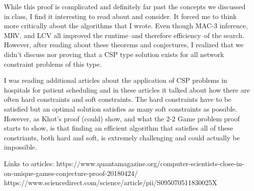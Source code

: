 \documentclass{article}
\begin{document}
While this proof is complicated and definitely far past the concepts we discussed in class, I find it interesting to read about and consider. It forced me to think more critically about the algorithms that I wrote. Even though MAC-3 inference, MRV, and LCV all improved the runtime--and therefore efficiency--of the search. However, after reading about these theorems and conjectures, I realized that we didn't discuss nor proving that a CSP type solution exists for all network constraint problems of this type. 

I was reading additional articles about the application of CSP problems in hospitals for patient scheduling and in these articles it talked about how there are often hard constraints and soft constraints. The hard constraints have to be satisfied but an optimal solution satisfies as many soft constraints as possible. However, as Khot's proof (could) show, and what the 2-2 Game problem proof starts to show, is that finding an efficient algorithm that satisfies all of these constriants, both hard and soft, is extremely challenging and could actually be impossible. 

Links to articles:
https://www.quantamagazine.org/computer-scientists-close-in-on-unique-games-conjecture-proof-20180424/
https://www.sciencedirect.com/science/article/pii/S095070511830025X
\end{document}

